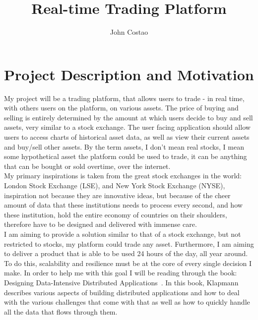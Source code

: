 \documentclass[titlepage]{article}
\title{Real-time Trading Platform}
\author{John Costao}
\begin{document}
\maketitle
  
\section{Project Description and Motivation}
My project will be a trading platform, that allows users to trade - in real time, with others users on the platform, on various assets. The price of buying and selling is entirely determined by the amount at which users decide to buy and sell assets, very similar to a stock exchange. The user facing application should allow users to access charts of historical asset data, as well as view their current assets and buy/sell other assets. By the term assets, I don't mean real stocks, I mean some hypothetical asset the platform could be used to trade, it can be anything that can be bought or sold overtime, over the internet. \\

\noindent
My primary inspirations is taken from the great stock exchanges in the world: London Stock Exchange (LSE), and New York Stock Exchange (NYSE), inspiration not because they are innovative ideas, but because of the cheer amount of data that these institutions needs to process every second, and how these institution, hold the entire economy of countries on their shoulders, therefore have to be designed and delivered with immense care. \\

\noindent
I am aiming to provide a solution similar to that of a stock exchange, but not restricted to stocks, my platform could trade any asset. Furthermore, I am aiming to deliver a product that is able to be used 24 hours of the day, all year around. To do this, scalability and resilience must be at the core of every single decision I make. In order to help me with this goal I will be reading through the book: Designing Data-Intensive Distributed Applications~\cite{kleppmann_2021}. In this book, Klapmann describes various aspects of building distributed applications and how to deal with the various challenges that come with that as well as how to quickly handle all the data that flows through them. \\
\end{document}
